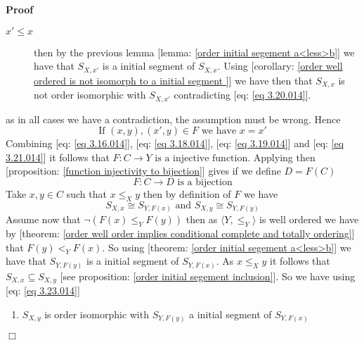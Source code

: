 \documentclass{book}
\newenvironment{enumeratealpha}{\begin{enumerate}[a{\textup{)}}] }{\end{enumerate}}
\newenvironment{proof}{\noindent\textbf{Proof\ }}{\hspace*{\fill}$\Box$\medskip}
\begin{document}
\begin{proof}
\begin{description}
    \item[$x' \leqslant x$] then by the previous lemma [lemma: \ref{order
    initial segement a<less>b}] we have that $S_{X, x'}$ is a initial segment
    of $S_{X, x}$. Using [corollary: \ref{order well ordered is not isomorph
    to a initial segment }] we have then that $S_{X, x}$ is not order
    isomorphic with $S_{X, x'}$ contradicting [eq: \ref{eq 3.20.014}].
  \end{description}
  as in all cases we have a contradiction, the assumption must be wrong. Hence
  \begin{equation}
    \label{eq 3.21.014} \text{If } (x, y), (x', y) \in F \text{ we have } x =
    x'
  \end{equation}
  Combining [eq: \ref{eq 3.16.014}], [eq: \ref{eq 3.18.014}], [eq: \ref{eq
  3.19.014}] and [eq: \ref{eq 3.21.014}] it follows that $F : C \rightarrow Y
  \text{ is a injective \ function}$. Applying then [proposition:
  \ref{function injectivity to bijection}] gives if we define $D = F (C)$
  \begin{equation}
    \label{eq 3.22.014} F : C \rightarrow D \text{ is a bijection}
  \end{equation}
  Take $x, y \in C$ such that $x \leqslant_X y $ then by definition of $F$ we
  have
  \begin{equation}
    \label{eq 3.23.014} S_{X, x} \cong S_{Y, F (x)} \text{ and } S_{X, y}
    \cong S_{Y, F (y)}
  \end{equation}
  Assume now that $\neg (F (x) \leqslant_Y F (y))$ then as $\langle Y,
  \leqslant_Y \rangle$ is well ordered we have by [theorem: \ref{order well
  order implies conditional complete and totally ordering}] that $F (y) <_Y F
  (x)$. So using [theorem: \ref{order initial segement a<less>b}] we have that
  $S_{Y, F (y)}$ is a initial segment of $S_{Y, F (x)}$. As $x \leqslant_X y$
  it follows that $S_{X, x} \subseteq S_{X, y}$ [see proposition: \ref{order
  initial segement inclusion}]. So we have using [eq: \ref{eq 3.23.014}]
  \begin{enumeratealpha}
    \item $S_{X, y}$ is order isomorphic with $S_{Y, F (y)}$ a initial segment
    of $S_{Y, F (x)}$
    

\end{enumeratealpha}
\end{proof}
\end{document}
